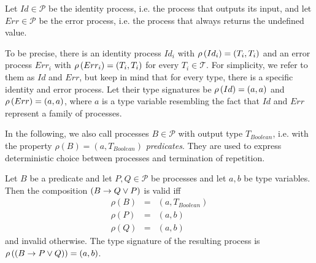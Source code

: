 
\begin{definition}
\label{def:static_id_err}
Let $Id \in \mathcal{P}$ be the identity process, i.e. the process that outputs its input, and let $Err \in \mathcal{P}$ be the error process, i.e. the process that always returns the undefined value.

\hfill\qedsymbol
\end{definition}

To be precise, there is an identity process $Id_i$ with $\rho \left( Id_i \right) = \left( T_i, T_i \right)$ and an error process $Err_i$ with $\rho \left( Err_i \right) = \left( T_i, T_i \right)$ for every $T_i \in \mathcal{T}$. For simplicity, we refer to them as $Id$ and $Err$, but keep in mind that for every type, there is a specific identity and error process. Let their type signatures be $\rho \left( Id \right) = \left( a, a \right)$ and $\rho \left( Err \right) = \left( a, a \right)$, where $a$ is a type variable resembling the fact that $Id$ and $Err$ represent a family of processes.

In the following, we also call processes $B \in \mathcal{P}$ with output type $T_{Boolean}$, i.e. with the property $\rho \left( B \right) = \left( a, T_{Boolean} \right)$ \textit{predicates}. They are used to express deterministic choice between processes and termination of repetition.

\begin{definition}
\label{def:static_choice}
Let $B$ be a predicate and let $P, Q \in \mathcal{P}$ be processes and let $a, b$ be type variables. Then the composition $\left( B \to Q \vee P \right)$ is valid iff
\begin{eqnarray*}
  \rho \left( B \right) & = & \left( a, T_{Boolean} \right) \\
  \rho \left( P \right) & = & \left( a, b \right) \\
  \rho \left( Q \right) & = & \left( a, b \right)
\end{eqnarray*}
and invalid otherwise. The type signature of the resulting process is $\rho \left( \left( B \to P \vee Q \right) \right) = \left( a, b \right)$.

\hfill\qedsymbol
\end{definition}



